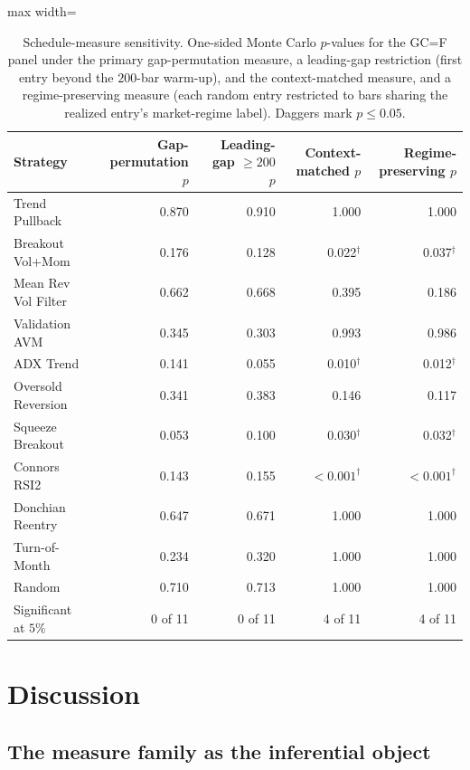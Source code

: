 \documentclass[preprint,12pt]{elsarticle}
\theoremstyle{definition}
\begin{document}
\begin{table}[H]
\centering
\caption{Schedule-measure sensitivity. One-sided Monte Carlo $p$-values for the GC=F panel under the primary gap-permutation measure, a leading-gap restriction (first entry beyond the $200$-bar warm-up), and the context-matched measure, and a regime-preserving measure (each random entry restricted to bars sharing the realized entry's market-regime label). Daggers mark $p\le 0.05$.}
\label{tab:schedule_sensitivity}
{\small
\renewcommand{\arraystretch}{1.12}
\setlength{\tabcolsep}{7pt}
\begin{adjustbox}{max width=\textwidth}
\begin{tabular}{@{}lrrrr@{}}
\toprule
Strategy & Gap-permutation $p$ & Leading-gap $\ge 200$ $p$ & Context-matched $p$ & Regime-preserving $p$ \\
\midrule
Trend Pullback      & 0.870 & 0.910 & 1.000 & 1.000 \\
Breakout Vol+Mom    & 0.176 & 0.128 & 0.022$^\dagger$ & 0.037$^\dagger$ \\
Mean Rev Vol Filter & 0.662 & 0.668 & 0.395 & 0.186 \\
Validation AVM      & 0.345 & 0.303 & 0.993 & 0.986 \\
ADX Trend           & 0.141 & 0.055 & 0.010$^\dagger$ & 0.012$^\dagger$ \\
Oversold Reversion  & 0.341 & 0.383 & 0.146 & 0.117 \\
Squeeze Breakout    & 0.053 & 0.100 & 0.030$^\dagger$ & 0.032$^\dagger$ \\
Connors RSI2        & 0.143 & 0.155 & ${<}0.001^\dagger$ & ${<}0.001^\dagger$ \\
Donchian Reentry    & 0.647 & 0.671 & 1.000 & 1.000 \\
Turn-of-Month       & 0.234 & 0.320 & 1.000 & 1.000 \\
Random              & 0.710 & 0.713 & 1.000 & 1.000 \\
\midrule
Significant at $5\%$ & 0 of 11 & 0 of 11 & 4 of 11 & 4 of 11 \\
\bottomrule
\end{tabular}
\end{adjustbox}
}
\end{table}


\section{Discussion}
\label{sec:discussion}


\subsection{The measure family as the inferential object}
\label{sec:discussion-measure}
\end{document}

